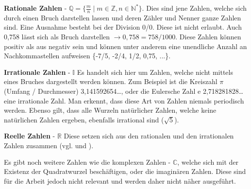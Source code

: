 \documentclass[12pt,a4paper]{article}
\theoremstyle{definition}
\begin{document}
\textbf{Rationale Zahlen} - $\mathbb{Q} = \{\frac{m}{n} \mid m \in \mathbb{Z}, n \in \mathbb{N}^*\}$.\newline
Dies sind jene Zahlen, welche sich durch einen Bruch darstellen lassen und deren Zähler und Nenner ganze Zahlen sind.
Eine Ausnahme besteht bei der Division 0/0.
Diese ist nicht erlaubt.
Auch 0,758 lässt sich als Bruch darstellen $\rightarrow{0,758 = 758/1000}$.
Diese Zahlen können positiv als aus negativ sein und können unter anderem eine unendliche Anzahl an Nachkommastellen aufweisen \{-7/5, -2/4, 1/2, 0,75, ...\}.

\textbf{Irrationale Zahlen} - $\mathbb{I}$\newline
Es handelt sich hier um Zahlen, welche nicht mittels eines Bruches dargestellt werden können.
Zum Beispiel ist die Kreiszahl $\pi$ (Umfang / Durchmesser) 3,141592654…, oder die Eulersche Zahl $\mathrm{e}$ 2,718281828… eine irrationale Zahl.
Man erkennt, dass diese Art von Zahlen niemals periodisch werden.
Ebenso gilt, dass alle Wurzeln natürlicher Zahlen, welche keine natürlichen Zahlen ergeben, ebenfalls irrational sind ($\sqrt{5}$).

\textbf{Reelle Zahlen} - $\mathbb{R}$\newline
Diese setzen sich aus den rationalen und den irrationalen Zahlen zusammen (vgl. \cite[7--9]{Engel2017} und \cite[5--6]{Houston2012}).

Es gibt noch weitere Zahlen wie die komplexen Zahlen - $\mathbb{C}$, welche sich mit der Existenz der Quadratwurzel beschäftigen, oder die  imaginären Zahlen.
Diese sind für die Arbeit jedoch nicht relevant und werden daher nicht näher ausgeführt.
\end{document}

